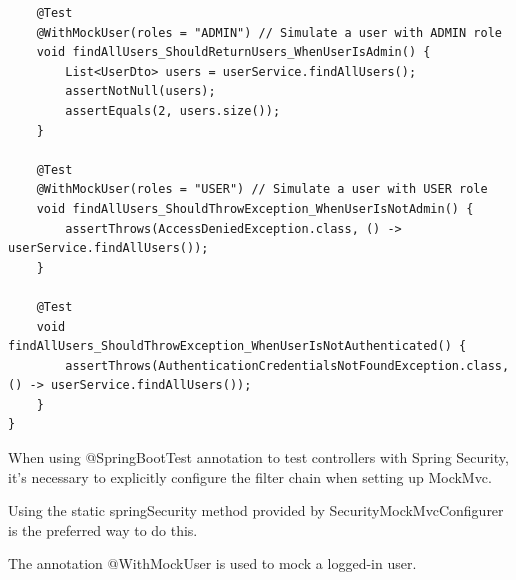\begin{lstlisting}
    @Test
    @WithMockUser(roles = "ADMIN") // Simulate a user with ADMIN role
    void findAllUsers_ShouldReturnUsers_WhenUserIsAdmin() {
        List<UserDto> users = userService.findAllUsers();
        assertNotNull(users);
        assertEquals(2, users.size());
    }

    @Test
    @WithMockUser(roles = "USER") // Simulate a user with USER role
    void findAllUsers_ShouldThrowException_WhenUserIsNotAdmin() {
        assertThrows(AccessDeniedException.class, () -> userService.findAllUsers());
    }

    @Test
    void findAllUsers_ShouldThrowException_WhenUserIsNotAuthenticated() {
        assertThrows(AuthenticationCredentialsNotFoundException.class, () -> userService.findAllUsers());
    }
}

\end{lstlisting}

When using @SpringBootTest annotation to test controllers with Spring Security, it's necessary to explicitly configure the filter chain when setting up MockMvc.

Using the static springSecurity method provided by  SecurityMockMvcConfigurer is the preferred way to do this.

The annotation @WithMockUser is used to mock a logged-in user.







